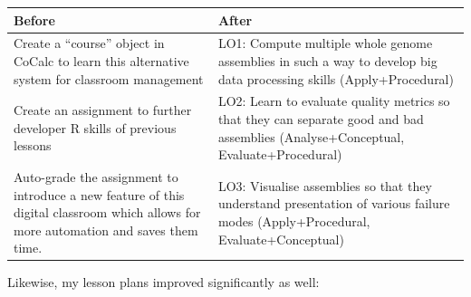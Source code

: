 \documentclass[paper=a4,justified,a4paper]{tufte-handout}
\begin{document}
\begin{longtable}[]{@{}ll@{}}
\toprule
\begin{minipage}[b]{0.47\columnwidth}\raggedright
Before\strut
\end{minipage} & \begin{minipage}[b]{0.47\columnwidth}\raggedright
After\strut
\end{minipage}\tabularnewline
\midrule
\endhead
\begin{minipage}[t]{0.47\columnwidth}\raggedright
Create a ``course'' object in CoCalc to learn this alternative system
for classroom management\strut
\end{minipage} & \begin{minipage}[t]{0.47\columnwidth}\raggedright
LO1: Compute multiple whole genome assemblies in such a way to develop
big data processing skills (Apply+Procedural)\strut
\end{minipage}\tabularnewline
\begin{minipage}[t]{0.47\columnwidth}\raggedright
Create an assignment to further developer R skills of previous
lessons\strut
\end{minipage} & \begin{minipage}[t]{0.47\columnwidth}\raggedright
LO2: Learn to evaluate quality metrics so that they can separate good
and bad assemblies (Analyse+Conceptual, Evaluate+Procedural)\strut
\end{minipage}\tabularnewline
\begin{minipage}[t]{0.47\columnwidth}\raggedright
Auto-grade the assignment to introduce a new feature of this digital
classroom which allows for more automation and saves them time.\strut
\end{minipage} & \begin{minipage}[t]{0.47\columnwidth}\raggedright
LO3: Visualise assemblies so that they understand presentation of
various failure modes (Apply+Procedural, Evaluate+Conceptual)\strut
\end{minipage}\tabularnewline
\bottomrule
\end{longtable}

Likewise, my lesson plans improved significantly as well:
\end{document}
